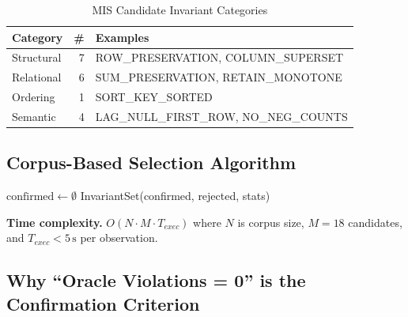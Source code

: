 \documentclass[conference]{IEEEtran}
\begin{document}
\begin{table}[t]
  \caption{MIS Candidate Invariant Categories}
  \label{tab:inv_cats}
  \centering
  \small
  \begin{tabular}{@{}l r l@{}}
    \toprule
    \textbf{Category} & \textbf{\#} & \textbf{Examples} \\
    \midrule
    Structural  & 7 & ROW\_PRESERVATION, COLUMN\_SUPERSET \\
    Relational  & 6 & SUM\_PRESERVATION, RETAIN\_MONOTONE \\
    Ordering    & 1 & SORT\_KEY\_SORTED \\
    Semantic    & 4 & LAG\_NULL\_FIRST\_ROW, NO\_NEG\_COUNTS \\
    \bottomrule
  \end{tabular}
\end{table}

\subsection{Corpus-Based Selection Algorithm}

\begin{algorithm}[t]
\caption{MIS}
\label{alg:mis}
$\text{confirmed} \leftarrow \emptyset$\;
\Return InvariantSet(confirmed, rejected, stats)\;
\end{algorithm}

\textbf{Time complexity.} $O(N \cdot M \cdot T_{exec})$ where $N$ is corpus size,
$M = 18$ candidates, and $T_{exec} < 5\,\text{s}$ per observation.

\subsection{Why ``Oracle Violations = 0'' is the Confirmation Criterion}
\end{document}
